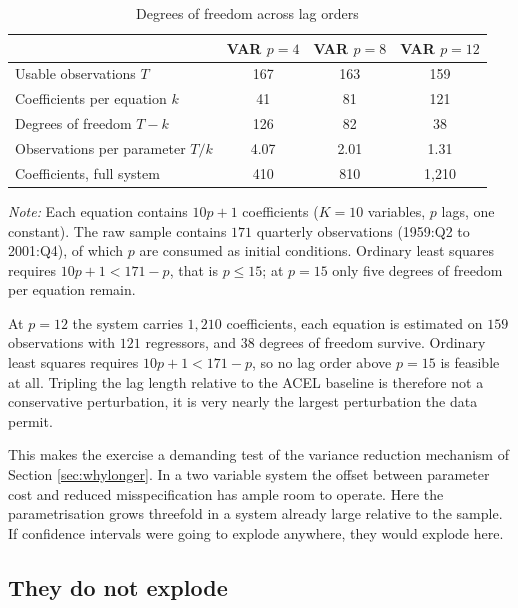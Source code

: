 \begin{table}[htpb]
    \centering
    \small
    \renewcommand{\arraystretch}{1.2}
    \caption{Degrees of freedom across lag orders}
    \label{tab:df_budget}
    \begin{tabular}{lccc}
    \toprule
    & \textbf{VAR $p=4$} & \textbf{VAR $p=8$} & \textbf{VAR $p=12$} \\
    \midrule
    Usable observations $T$          & 167 & 163 & 159 \\
    Coefficients per equation $k$    & 41  & 81  & 121 \\
    Degrees of freedom $T-k$         & 126 & 82  & 38  \\
    Observations per parameter $T/k$ & 4.07 & 2.01 & 1.31 \\
    Coefficients, full system        & 410 & 810 & 1{,}210 \\
    \bottomrule
    \end{tabular}

    \vspace{0.2cm}
    \centering
    \scriptsize{\textit{Note:} Each equation contains $10p+1$ coefficients ($K=10$ variables,
    $p$ lags, one constant). The raw sample contains $171$ quarterly observations
    (1959:Q2 to 2001:Q4), of which $p$ are consumed as initial conditions. Ordinary least
    squares requires $10p+1 < 171-p$, that is $p \leq 15$; at $p=15$ only five degrees of
    freedom per equation remain.}
\end{table}
\FloatBarrier

At $p=12$ the system carries $1{,}210$ coefficients, each equation is estimated on $159$
observations with $121$ regressors, and $38$ degrees of freedom survive. Ordinary least squares
requires $10p+1 < 171-p$, so no lag order above $p=15$ is feasible at all. Tripling the lag
length relative to the ACEL baseline is therefore not a conservative perturbation, it is very
nearly the largest perturbation the data permit.

This makes the exercise a demanding test of the variance reduction mechanism of Section
\ref{sec:whylonger}. In a two variable system the offset between parameter cost and reduced
misspecification has ample room to operate. Here the parametrisation grows threefold in a
system already large relative to the sample. If confidence intervals were going to explode
anywhere, they would explode here.

\subsection{They do not explode}

